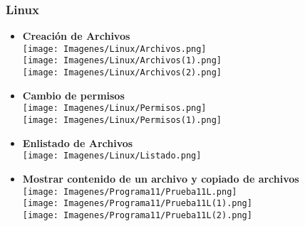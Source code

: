 \documentclass[12pt]{article}
\begin{document}
    \subsubsection{Linux}
    \begin{itemize}
        \item \textbf{Creación de Archivos}\\
         \texttt{[image: Imagenes/Linux/Archivos.png]}\\
         \texttt{[image: Imagenes/Linux/Archivos(1).png]}\\
         \texttt{[image: Imagenes/Linux/Archivos(2).png]}\\
         \newpage
        \item \textbf{Cambio de permisos}\\
        \texttt{[image: Imagenes/Linux/Permisos.png]}\\
        \texttt{[image: Imagenes/Linux/Permisos(1).png]}\\
        \newpage
        \item  \textbf{ Enlistado de Archivos}\\
        \texttt{[image: Imagenes/Linux/Listado.png]}\\
        \item \textbf{Mostrar contenido de un archivo y copiado de archivos}\\
        \texttt{[image: Imagenes/Programa11/Prueba11L.png]}\\
        
        \texttt{[image: Imagenes/Programa11/Prueba11L(1).png]}\\
        
        \texttt{[image: Imagenes/Programa11/Prueba11L(2).png]}\\
     
    \end{itemize}
\end{document}
